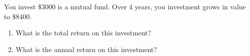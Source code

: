 \documentclass[12pt]{article}
\begin{document}
\pagebreak
{}
You invest $\$3000$ is a mutual fund.  Over 4 years, you investment grows in value to $\$8400$.

\begin{enumerate}
\item What is the total return on this investment?
\iftoggle{sol}{
{\it Solution:

We use Eq.~\eqref{eq:total} with $P=\$3000$ and $A=\$8400$ to find the total return:
\begin{eqnarray*}
	\text{total return} &=& \frac{\Big(A-P\Big)}{P}\times 100\% \\
	&=& \frac{\$\Big(8400-3000\Big)}{\$3000}\times 100\% \\
	&=& 1.8 \times 100\% \\
	&=& 180 \%
\end{eqnarray*}

}

}{\vspace{2in}}
\item What is the annual return on this investment?

\iftoggle{sol}{
{\it Solution:

We use Eq.~\eqref{eq:annual} with $P=3000$ and $A=8400$ to find the total return:
\begin{eqnarray*}
	\text{annual return} &=& \Big[\Big(\frac{A}{P}\Big)^{(1 / Y)} - 1\Big] \times 100\% \\
	&=& \Big[\Big(\frac{8400}{3000}\Big)^{(1 / 4)} - 1\Big] \times 100\% \\
	&=& 0.29 \times 100\% \\
	&=& 29 \%
\end{eqnarray*}

}
}{\vspace{2in}}
\end{enumerate}
\end{document}
